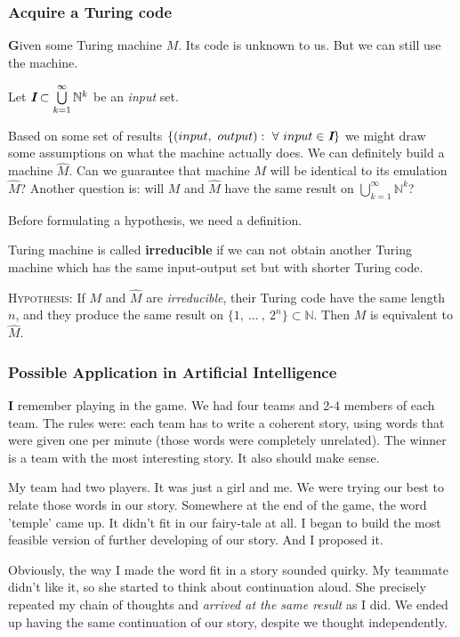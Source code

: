 \documentclass{beamer}
\def\mathbi#1{\textbf{\em #1}}
\begin{document}
\begin{frame}
\frametitle{Acquire a Turing code}
\textbf{\large G}iven some Turing machine $M$. Its code is unknown to us. But we can still use the machine. 

Let $\mathbi{I}\subset\bigcup\limits_{k=1}^{\infty}\mathbb{N}^k$ be an \emph{input} set.

Based on some set of results $\{(input,\ output):\  \forall\ input\in \mathbi{I}\}$ we might draw some assumptions on what the machine actually does. We can definitely build a machine $\hat{M}$. Can we guarantee that machine $M$ will be identical to its emulation $\hat{M}$? Another question is: will $M$ and $\hat{M}$ have the same result on $\bigcup\limits_{k=1}^{\infty}\mathbb{N}^k$?

Before formulating a hypothesis, we need a definition.
\end{frame}

\begin{frame}

\begin{definition}
Turing machine is called \textbf{irreducible} if we can not obtain another Turing machine which has the same input-output set but with shorter Turing code. 
\end{definition}

\textsc{Hypothesis}: If $M$ and $\hat{M}$ are \emph{irreducible}, their Turing code have the same length $n$, and they produce the same result on $\{1,\ \dots\ ,\ 2^n\}\subset\mathbb{N}$. Then $M$ is equivalent to $\hat{M}$.
\end{frame}

\begin{frame}
\frametitle{Possible Application in Artificial Intelligence}
\textbf{\large I} remember playing in the game. We had four teams and 2-4 members of each team. The rules were: each team has to write a coherent story, using words that were given one per minute (those words were completely unrelated). The winner is a team with the most interesting story. It also should make sense.

My team had two players. It was just a girl and me. We were trying our best to relate those words in our story. Somewhere at the end of the game, the word 'temple' came up. It didn't fit in our fairy-tale at all. I began to build the most feasible version of further developing of our story. And I proposed it.

Obviously, the way I made the word fit in a story sounded quirky. My teammate didn't like it, so she started to think about continuation aloud. She precisely repeated my chain of thoughts and \emph{arrived at the same result} as I did. We ended up having the same continuation of our story, despite we thought independently.
\end{frame}
\end{document}
